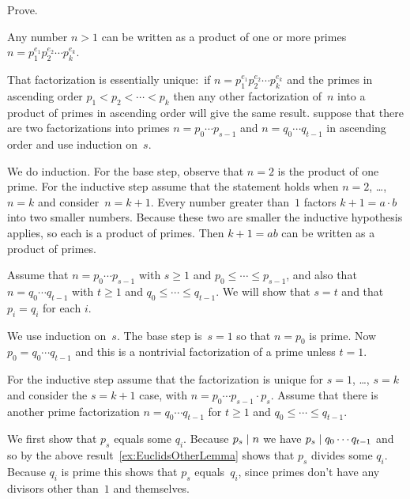 \documentclass{ibl}  %
\begin{document}
\begin{ex}  Prove.
\begin{exes}
\item Any number $n>1$ can be written as a product of one or more primes
$n=p_1^{e_1}p_2^{e_2}\cdots p_k^{e_k}$.
\item That factorization is essentially unique:~if 
$n=p_1^{e_1}p_2^{e_2}\cdots p_k^{e_k}$ and the primes
in ascending order $p_1<p_2<\cdots<p_k$ then any other
factorization of~$n$ into a product of primes in ascending order will give the
same result. 
\hint suppose that there are two factorizations into primes $n=p_0\cdots p_{s-1}$
and $n=q_0\cdots q_{t-1}$ in ascending order and use induction on~$s$.     
\end{exes}
\begin{ans}
\begin{exes}
\item We do induction.
For the base step, observe that $n=2$ is the product of one prime. 
For the inductive step assume that the statement holds when $n=2$, \ldots, 
$n=k$ and consider~$n=k+1$.
Every number greater than~$1$ factors $k+1=a\cdot b$ into two smaller
numbers.
Because these two are smaller
the inductive hypothesis applies, so each is a product of 
primes.
Then $k+1=ab$ can be written as a product of primes.
\item Assume that $n=p_0\cdots p_{s-1}$ with $s\geq 1$ and
$p_0\leq\cdots \leq p_{s-1}$, 
and also that $n=q_0\cdots q_{t-1}$ with $t\geq 1$ 
and $q_0\leq\cdots \leq q_{t-1}$.
We will show that $s=t$ and that $p_i=q_i$ for each $i$.

We use induction on~$s$.
The base step is~$s=1$ so that $n=p_0$ is prime.
Now $p_0=q_0\cdots q_{t-1}$ and this is a nontrivial factorization of a prime
unless $t=1$.

For the inductive step assume that the factorization is unique for
$s=1$, \ldots, $s=k$ and consider the $s=k+1$ case, with
$n=p_0\cdots p_{s-1}\cdot p_s$.   
Assume that there is another prime factorization $n=q_0\cdots q_{t-1}$
for $t\geq 1$ and $q_0\leq\cdots \leq q_{t-1}$.

We first show that $p_s$ equals some $q_i$.
Because $p_s\mid n$ we have $p_s\mid q_0\cdots q_{t-1}$ and so
by the above result~\ref{ex:EuclidsOtherLemma} shows that
$p_s$ divides some $q_i$.
Because $q_i$ is prime this shows that $p_s$ equals~$q_i$,
since primes don't have any divisors other than~$1$ and themselves.


\end{exes}
\end{ans}
\end{ex}
\end{document}
